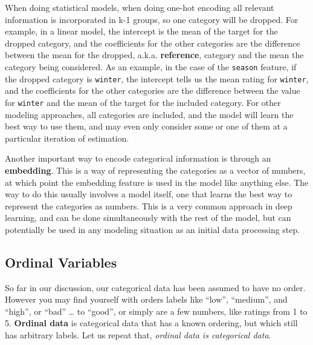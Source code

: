 \documentclass[
  letterpaper,
]{krantz}
\begin{document}
\begin{tcolorbox}[enhanced jigsaw, toprule=.15mm, arc=.35mm, rightrule=.15mm, bottomrule=.15mm, leftrule=.75mm, breakable, colframe=quarto-callout-note-color-frame, colback=white, left=2mm, opacityback=0]
\begin{minipage}[t]{5.5mm}
\textcolor{quarto-callout-note-color}{\faInfo}
\end{minipage}%
\begin{minipage}[t]{\textwidth - 5.5mm}

When doing statistical models, when doing one-hot encoding all relevant
information is incorporated in k-1 groups, so one category will be
dropped. For example, in a linear model, the intercept is the mean of
the target for the dropped category, and the coefficients for the other
categories are the difference between the mean for the dropped, a.k.a.
\textbf{reference}, category and the mean the category being considered.
As an example, in the case of the \texttt{season} feature, if the
dropped category is \texttt{winter}, the intercept tells us the mean
rating for \texttt{winter}, and the coefficients for the other
categories are the difference between the value for \texttt{winter} and
the mean of the target for the included category. For other modeling
approaches, all categories are included, and the model will learn the
best way to use them, and may even only consider some or one of them at
a particular iteration of estimation.

\end{minipage}%
\end{tcolorbox}

Another important way to encode categorical information is through an
\textbf{embedding}. This is a way of representing the categories as a
vector of numbers, at which point the embedding feature is used in the
model like anything else. The way to do this usually involves a model
itself, one that learns the best way to represent the categories as
numbers. This is a very common approach in deep learning, and can be
done simultaneously with the rest of the model, but can potentially be
used in any modeling situation as an initial data processing step.

\subsection{Ordinal Variables}\label{sec-data-ordinal}

So far in our discussion, our categorical data has been assumed to have
no order. However you may find yourself with orders labels like ``low'',
``medium'', and ``high'', or ``bad'' \ldots{} to ``good'', or simply are
a few numbers, like ratings from 1 to 5. \textbf{Ordinal data} is
categorical data that has a known ordering, but which still has
arbitrary labels. Let us repeat that, \emph{ordinal data is categorical
data}.
\end{document}
